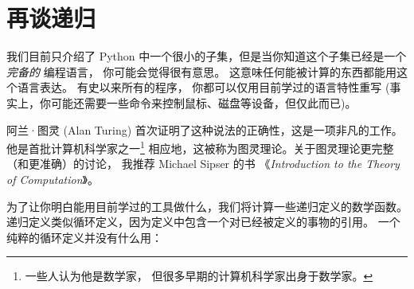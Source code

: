 \section{再谈递归}
\label{more.recursion}
  
    


我们目前只介绍了 Python 中一个很小的子集，但是当你知道这个子集已经是一个 {\em 完备的} 编程语言， 你可能会觉得很有意思。
这意味任何能被计算的东西都能用这个语言表达。
有史以来所有的程序， 你都可以仅用目前学过的语言特性重写 (事实上，你可能还需要一些命令来控制鼠标、磁盘等设备，但仅此而已)。


阿兰·图灵 (Alan Turing) 首次证明了这种说法的正确性，这是一项非凡的工作。
他是首批计算机科学家之一\footnote{一些人认为他是数学家，
但很多早期的计算机科学家出身于数学家。}
相应地，这被称为图灵理论。关于图灵理论更完整（和更准确）的讨论，
我推荐 Michael Sipser 的书 《{\em Introduction to the Theory of Computation}》。


为了让你明白能用目前学过的工具做什么，我们将计算一些递归定义的数学函数。
递归定义类似循环定义，因为定义中包含一个对已经被定义的事物的引用。
一个纯粹的循环定义并没有什么用：

